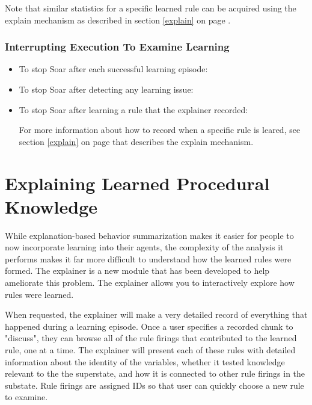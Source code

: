 Note that similar statistics for a specific learned rule can be acquired using the explain mechanism as described in section \ref{explain} on page \pageref{explain}.

\subsubsection{Interrupting Execution To Examine Learning}

\begin{itemize}
	\item To stop Soar after each successful learning episode: \newline {}
	\item To stop Soar after detecting any learning issue: \newline {}
	\item To stop Soar after learning a rule that the explainer recorded: \newline {}

For more information about how to record when a specific rule is leared, see section \ref{explain} on page \pageref{explain} that describes the explain mechanism.

\end{itemize}


\section{Explaining Learned Procedural Knowledge}

While explanation-based behavior summarization makes it easier for people to now incorporate learning into their agents, the complexity of the analysis it performs makes it far more difficult to understand how the learned rules were formed. The explainer is a new module that has been developed to help ameliorate this problem. The explainer allows you to interactively explore how rules were learned.

When requested, the explainer will make a very detailed record of everything that happened during a learning episode. Once a user specifies a recorded chunk to "discuss", they can browse all of the rule firings that contributed to the learned rule, one at a time. The explainer will present each of these rules with detailed information about the identity of the variables, whether it tested knowledge relevant to the the superstate, and how it is connected to other rule firings in the substate. Rule firings are assigned IDs so that user can quickly choose a new rule to examine.

